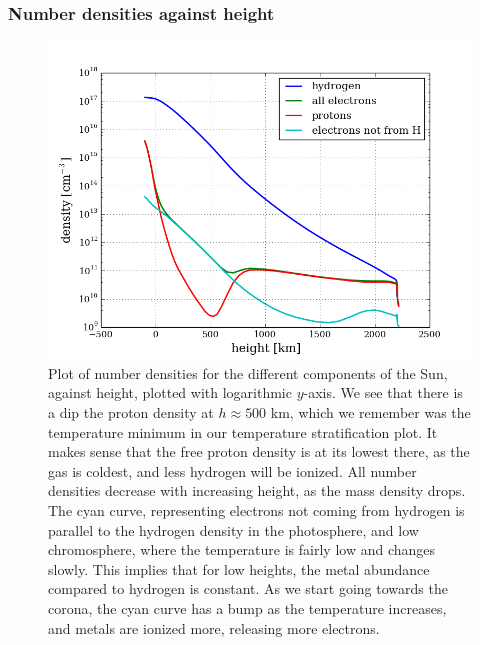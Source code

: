 \documentclass{article}
\begin{document}
\subsubsection{Number densities against height}
\begin{figure}[H]
  \centering
  \includegraphics[scale=0.5]{../figures/falc/falc_h_n_log.png}
  \caption{Plot of number densities for the different components of the Sun, against height, plotted with logarithmic $y$-axis. We see that there is a dip the proton density at $h\approx500$ km, which we remember was the temperature minimum in our temperature stratification plot. It makes sense that the free proton density is at its lowest there, as the gas is coldest, and less hydrogen will be ionized. All number densities decrease with increasing height, as the mass density drops. The cyan curve, representing electrons not coming from hydrogen is parallel to the hydrogen density in the photosphere, and low chromosphere, where the temperature is fairly low and changes slowly. This implies that for low heights, the metal abundance compared to hydrogen is constant. As we start going towards the corona, the cyan curve has a bump as the temperature increases, and metals are ionized more, releasing more electrons.}
\end{figure}
\end{document}
